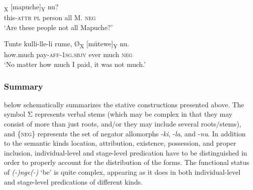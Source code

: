 \documentclass[output=paper,colorlinks,citecolor=brown,draft]{langscibook}
\begin{document}
    \ex\label{ex:mapu:16b}
        \textsubscript{X} [mapuche]\textsubscript{Y} nu? \\
             this-\textsc{attr} \textsc{pl} person   all M.   \textsc{neg}\\
        \glt ‘Are these people not all Mapuche?’ \citep[144]{Smeets2008}
    
    \ex\label{ex:mapu:16c}
        \gll Tunte kulli-lle-li rume, Ø\textsubscript{X} [mütewe]\textsubscript{Y} nu. \\
        how.much pay-\textsc{aff-1sg.sbjv} ever {} much \textsc{neg} \\
        \glt ‘No matter how much I paid, it was not much.’ \citep[144]{Smeets2008}
    \z
\z 

\subsubsection{Summary}

 below schematically summarizes the stative constructions presented above. The symbol Σ represents verbal stems (which may be complex in that they may consist of more than just roots, and/or they may include several roots/stems), and \{\textsc{neg}\} represents the set of negator allomorphs \nobreakdash-\textit{ki}, -\textit{la}, and \nobreakdash-\textit{nu}. In addition to the semantic kinds location, attribution, existence, possession, and proper inclusion, individual-level and stage-level predication have to be distinguished in order to properly account for the distribution of the forms. The functional status of \textit{(-)nge(-)} ‘be’ is quite complex, appearing as it does in both individual-level and stage-level predications of different kinds.
\end{document}
